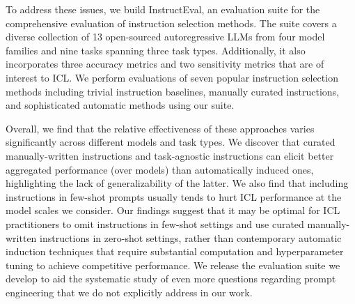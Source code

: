 To address these issues, we build InstructEval, an evaluation suite for the comprehensive evaluation of instruction selection methods. The suite covers a diverse collection of 13 open-sourced autoregressive LLMs from four model families and nine tasks spanning three task types. Additionally, it also incorporates three accuracy metrics and two sensitivity metrics that are of interest to ICL.
We perform evaluations of seven popular instruction selection methods including trivial instruction baselines, manually curated instructions, and sophisticated automatic methods using our suite. 

Overall, we find that the relative effectiveness of these approaches varies significantly across different models and task types. We discover that curated manually-written instructions and task-agnostic instructions can elicit better aggregated performance (over models) than automatically induced ones, highlighting the lack of generalizability of the latter. We also find that including instructions in few-shot prompts usually tends to hurt ICL performance at the model scales we consider. Our findings suggest that it may be optimal for ICL practitioners to omit instructions in few-shot settings and use curated manually-written instructions in zero-shot settings, rather than contemporary automatic induction techniques that require substantial computation and hyperparameter tuning to achieve competitive performance.
We release the evaluation suite we develop to aid the systematic study of even more questions regarding prompt engineering that we do not explicitly address in our work.
